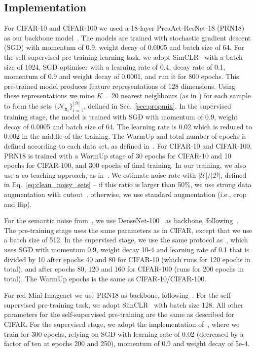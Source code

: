 \documentclass{bmvc2k}
\begin{document}
\subsection{Implementation}

For CIFAR-10 and CIFAR-100 we used a 18-layer 
PreaAct-ResNet-18 (PRN18)~\citep{he2016identity}  
as our backbone model~\citep{DivideMix}. The models are trained with stochastic gradient descent (SGD) with momentum of 0.9, weight decay of 0.0005 and batch size of 64. For the self-supervised pre-training learning task, we adopt SimCLR~\citep{SimCLR} with a batch size of 1024, SGD optimiser with a learning rate of 0.4, decay rate of 0.1, momentum of 0.9 and weight decay of 0.0001, and run it for 800 epochs.  This pre-trained model produces feature representations of 128 dimensions. Using these representations we mine $K = 20$ nearest neighbours (as in \citep{SCAN}) for each sample to form the sets $\{ \mathcal{N}_{\mathbf{x}_{i}}\}_{i=1}^{|\mathcal{D}|}$, defined in Sec.~\ref{sec:propmix}. In the supervised training stage, the model is trained with SGD with momentum of 0.9, weight decay of 0.0005 and batch size of 64. The learning rate is 0.02 which is reduced to 0.002 in the middle of the training. The WarmUp and total number of epochs is defined according to each data set, as defined in~\citep{DivideMix}. 
For CIFAR-10 and CIFAR-100, PRN18 is trained with a WarmUp stage of 30 epochs for CIFAR-10 and 10 epochs for CIFAR-100, and 300 epochs of final training. In our training, we also use a co-teaching approach, as in~\citep{DivideMix, elr2020, han2018co}. 
We estimate noise rate with $|\mathcal{U}|/|\mathcal{D}|$, defined in Eq.~\ref{eq:clean_noisy_sets} -- if this ratio is larger than 50\%, we use strong data augmentation with cutout~\citep{cubuk2019autoaugment}, otherwise, we use standard augmentation (i.e., crop and flip). 

For the semantic noise from~\citep{rog}, we use  DenseNet-100~\citep{iandola2014densenet} as backbone, following~\citep{rog}. The pre-training stage uses the same parameters as in CIFAR, except that we use a batch size of 512. In the supervised stage, we use the same protocol as~\citep{rog}, which uses SGD with momentum 0.9, weight decay 10-4 and learning rate of 0.1 that is divided by 10 after epochs 40 and 80 for CIFAR-10 (which runs for 120 epochs in total), and after epochs 80, 120 and 160 for CIFAR-100 (runs for 200 epochs in total). The WarmUp epochs is the same as CIFAR-10/CIFAR-100.

For red Mini-Imagenet we use PRN18 as backbone, following~\citep{FaMUS}. For the self-supervised pre-training task, we adopt SimCLR~\citep{SimCLR} with batch size 128. All other parameters for the self-supervised pre-training are the same as described for CIFAR. For the supervised stage, we adopt the implementation of~\citep{FaMUS}, where we train for 300 epochs,  relying on SGD with learning rate of 0.02 (decreased by a factor of ten at epochs 200 and 250), momentum of 0.9 and weight decay of 5e-4. 
\end{document}
